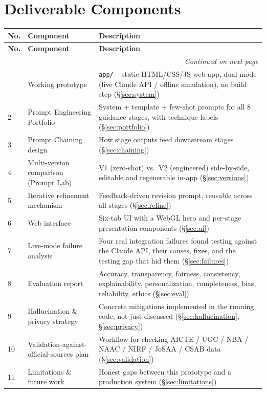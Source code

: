 \documentclass[11pt]{article}
\begin{document}
\section*{Deliverable Components}
\begin{longtable}{|p{1.1cm}|p{4cm}|p{9.3cm}|}
\toprule
\textbf{No.} & \textbf{Component} & \textbf{Description} \\
\midrule
\endfirsthead
\toprule
\textbf{No.} & \textbf{Component} & \textbf{Description} \\
\midrule
\endhead
\midrule
\multicolumn{3}{r}{\textit{Continued on next page}} \\
\endfoot
\bottomrule
\endlastfoot
1 & Working prototype & \texttt{app/} -- static HTML/CSS/JS web app, dual-mode (live Claude API / offline simulation), no build step (\S\ref{sec:system}) \\
2 & Prompt Engineering Portfolio & System + template + few-shot prompts for all 8 guidance stages, with technique labels (\S\ref{sec:portfolio}) \\
3 & Prompt Chaining design & How stage outputs feed downstream stages (\S\ref{sec:chaining}) \\
4 & Multi-version comparison (Prompt Lab) & V1 (zero-shot) vs.\ V2 (engineered) side-by-side, editable and regenerable in-app (\S\ref{sec:versions}) \\
5 & Iterative refinement mechanism & Feedback-driven revision prompt, reusable across all stages (\S\ref{sec:refine}) \\
6 & Web interface & Six-tab UI with a WebGL hero and per-stage presentation components (\S\ref{sec:ui}) \\
7 & Live-mode failure analysis & Four real integration failures found testing against the Claude API, their causes, fixes, and the testing gap that hid them (\S\ref{sec:failures}) \\
8 & Evaluation report & Accuracy, transparency, fairness, consistency, explainability, personalization, completeness, bias, reliability, ethics (\S\ref{sec:eval}) \\
9 & Hallucination \& privacy strategy & Concrete mitigations implemented in the running code, not just discussed (\S\ref{sec:hallucination}, \S\ref{sec:privacy}) \\
10 & Validation-against-official-sources plan & Workflow for checking AICTE / UGC / NBA / NAAC / NIRF / JoSAA / CSAB data (\S\ref{sec:validation}) \\
11 & Limitations \& future work & Honest gaps between this prototype and a production system (\S\ref{sec:limitations}) \\
\end{longtable}
\end{document}
